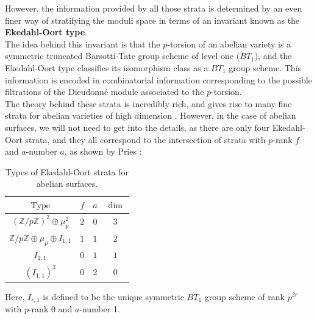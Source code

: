 \documentclass{amsart}
\newcommand{\Z}{\mathbb{Z}}
\numberwithin{equation}{section}
\theoremstyle{definition}
\theoremstyle{remark}
\begin{document}
However, the information provided by all those strata is determined by an even finer way of stratifying the moduli space in terms of an invariant known as the \textbf{Ekedahl-Oort type}.\\

The idea behind this invariant is that the $p$-torsion of an abelian variety is a symmetric truncated Barsotti-Tate group scheme of level one ($BT_1$), and the Ekedahl-Oort type classifies its isomorphism class as a $BT_1$ group scheme. This information is encoded in combinatorial information corresponding to the possible filtrations of the Dieudonné module associated to the $p$-torsion.\\


The theory behind these strata is incredibly rich, and gives rise to many fine strata for abelian varieties of high dimension \cites{Ekedahl2009CycleVarieties, Oort1974SubvarietiesSpaces}. However, in the case of abelian surfaces, we will not need to get into the details, as there are only four Ekedahl-Oort strata, and they all correspond to the intersection of strata with $p$-rank $f$ and $a$-number $a$, as shown by Pries \cite{Pries2008AP}:

\begin{table}[h]
\centering
\begin{tabular}{|c|c|c|c|}
\hline
\rowcolor[HTML]{a7c957} 
$\text{Type}$                    & $f$ & $a$ & $\dim$ \\ \hline
$(\Z/p\Z)^2\oplus\mu_p^2$                   & $2$ & $0$ & $3$                 \\ \hline
$\Z/p\Z\oplus\mu_p\oplus I_{1,1}$       & $1$ & $1$ & $2$                 \\ \hline
$I_{2,1}$               & $0$ & $1$ & $1$                 \\ \hline
$(I_{1,1})^2$ & $0$ & $2$ & $0$                 \\ \hline
\end{tabular}\vspace{10pt}


\caption{Types of Ekedahl-Oort strata for abelian surfaces.}
\end{table}

Here, $I_{r,1}$ is defined to be the unique symmetric $BT_1$ group scheme of rank $p^{2r}$ with $p$-rank 0 and $a$-number 1.\\
\end{document}
